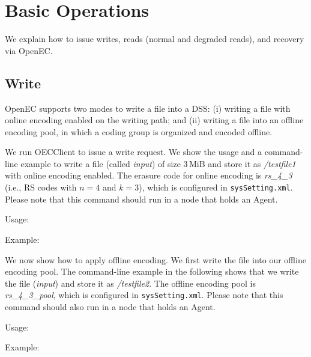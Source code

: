 \documentclass[letterpaper,12pt]{article}
\newcommand{\openec}{{\sf\small OpenEC}\xspace}
\begin{document}
\section{Basic Operations}
\label{sec:basic}

We explain how to issue writes, reads (normal and degraded reads), and
recovery via \openec. 

\subsection{Write}

\openec supports two modes to write a file into a DSS: (i) writing a file
with online encoding enabled on the writing path; and (ii) writing a file into
an offline encoding pool, in which a coding group is organized and encoded
offline.

We run OECClient to issue a write request. We show the usage and a
command-line example to write a file (called {\sl input}) of size 3\,MiB and
store it as {\sl /testfile1} with online encoding enabled. The erasure code
for online encoding is {\sl rs\_4\_3} (i.e., RS codes with $n=4$ and $k=3$),
which is configured in {\tt sysSetting.xml}.  Please note that this command
should run in a node that holds an Agent.

Usage:
\begin{center}
\noindent{}
\end{center}

Example:
\begin{center}
\noindent{}
\end{center}

We now show how to apply offline encoding. We first write the file into our
offline encoding pool.  The command-line example in the following shows that
we write the file ({\sl input}) and store it as {\sl /testfile2}. The offline
encoding pool is {\sl rs\_4\_3\_pool}, which is configured in 
{\tt sysSetting.xml}.  Please note that this command should also run in a node
that holds an Agent.

Usage:
\begin{center}
\noindent{}
\end{center}

Example:
\begin{center}
\noindent{}
\end{center}
\end{document}
